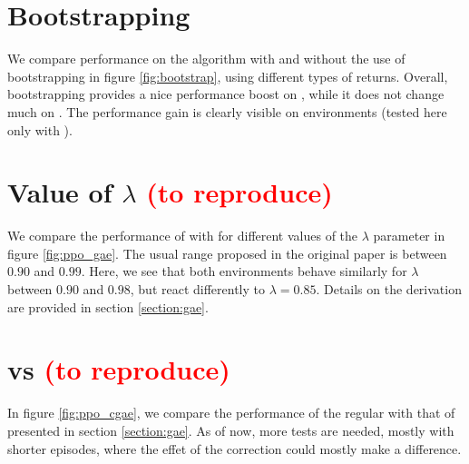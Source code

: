 \section{Bootstrapping}

We compare performance on the \ppo algorithm with and without the use of bootstrapping in figure \ref{fig:bootstrap}, using different types of returns. Overall, bootstrapping provides a nice performance boost on , while it does not change much on . The performance gain is clearly visible on \mujoco environments (tested here only with \gae).



\section{Value of \gae $\lambda$ \textcolor{red}{(to reproduce)}}

We compare the performance of \ppo with \gae for different values of the $\lambda$ parameter in figure \ref{fig:ppo_gae}. The usual range proposed in the original paper \cite{gae} is between $0.90$ and $0.99$. Here, we see that both environments behave similarly for $\lambda$ between $0.90$ and $0.98$, but react differently to $\lambda = 0.85$. Details on the \gae derivation are provided in section \ref{section:gae}.



\section{\gae vs \cgae \textcolor{red}{(to reproduce)}}

In figure \ref{fig:ppo_cgae}, we compare the performance of the regular \gae with that of \cgae presented in section \ref{section:gae}. As of now, more tests are needed, mostly with shorter episodes, where the effet of the \cgae correction could mostly make a difference.

